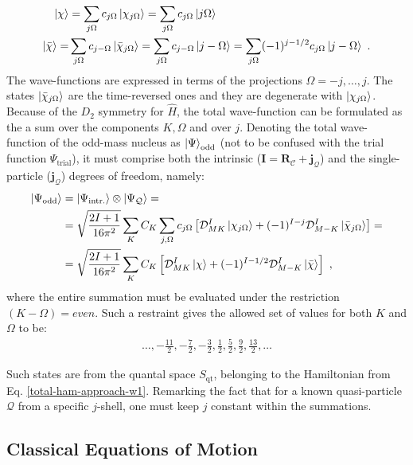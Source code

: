 \begin{align}
    \ket{\chi}&=\sum_{j\Omega}c_{j\Omega}\ket{\chi_{j\Omega}}=\sum_{j\Omega}c_{j\Omega}\ket{j\Omega}\nonumber\\
    \ket{\bar{\chi}}=&\sum_{j\Omega}c_{j-\Omega}\ket{\bar{\chi}_{j\Omega}}=\sum_{j\Omega}c_{j-\Omega}\ket{j-\Omega}=\sum_{j\Omega}(-1)^{j-1/2}c_{j\Omega}\ket{j-\Omega}\ .
    \label{j-Omega-single-particle-states}
\end{align}
The wave-functions are expressed in terms of the projections $\Omega=-j,\dots,j$. The states $\ket{\bar{\chi}_{j\Omega}}$ are the time-reversed ones and they are degenerate with $\ket{\chi_{j\Omega}}$. Because of the $D_2$ symmetry for $\hat{H}$, the total wave-function can be formulated as the a sum over the components $K, \Omega$ and over $j$. Denoting the total wave-function of the odd-mass nucleus as $\ket{\Psi}_\text{odd}$ (not to be confused with the trial function $\Psi_\text{trial}$), it must comprise both the intrinsic ($\mathbf{I}=\mathbf{R}_\mathscr{C}+\mathbf{j}_\mathcal{Q}$) and the single-particle ($\mathbf{j}_\mathcal{Q}$) degrees of freedom, namely:
\begin{align}
    \ket{\Psi_\text{odd}}&=\ket{\Psi_\text{intr.}}\otimes\ket{\Psi_\mathcal{Q}}=\nonumber\\
    &=\sqrt{\frac{2I+1}{16\pi^2}}\sum_K C_K\sum_{j,\Omega}c_{j\Omega}\left[\mathcal{D}_{MK}^I\ket{\chi_{j\Omega}}+(-1)^{I-j}\mathcal{D}_{M-K}^I\ket{\bar{\chi}_{j\Omega}}\right]=\nonumber\\
    &=\sqrt{\frac{2I+1}{16\pi^2}}\sum_K C_K \left[\mathcal{D}_{MK}^I\ket{\chi}+(-1)^{I-1/2}\mathcal{D}_{M-K}^I\ket{\bar{\chi}}\right]\ ,
    \label{total-wavefunction-oddA-general}
\end{align}
where the entire summation must be evaluated under the restriction $(K-\Omega)=even$. Such a restraint gives the allowed set of values for both $K$ and $\Omega$ to be:
\begin{align}
    \dots,-\frac{11}{2},-\frac{7}{2},-\frac{3}{2},\frac{1}{2},\frac{5}{2},\frac{9}{2},\frac{13}{2},\dots
\end{align}

Such states are from the quantal space $S_\text{qt}$, belonging to the Hamiltonian from Eq. \ref{total-ham-approach-w1}. Remarking the fact that for a known quasi-particle $\mathcal{Q}$ from a specific $j$-shell, one must keep $j$ constant within the summations. 

\subsection{Classical Equations of Motion}

